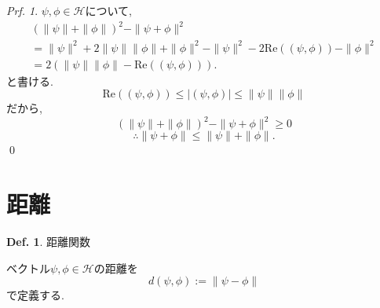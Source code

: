 \documentclass[a4paper,10pt,report]{amsart}
\theoremstyle{plain}
\theoremstyle{definition}
\newtheorem{defn}{Def.}[section]
\theoremstyle{remark}
\newtheorem{prf}{Prf.}
\begin{document}
\begin{prf}
    \(\psi,\phi\in\mathcal{H}\)について, 
    \begin{align*}
        {(\|\psi{}\|+\|\phi{}\|)}^{2}-\|\psi+\phi{}\|^{2}\\
        =\|\psi{}\|^{2}+2\|\psi{}\|{}\|\phi{}\|+\|\phi{}\|^{2}-\|\psi{}\|^{2}-2\mathrm{Re}((\psi,\phi))-\|\phi{}\|^{2}\\
        =2(\|\psi{}\|{}\|\phi{}\|-\mathrm{Re}((\psi,\phi))).
    \end{align*}
    と書ける. 
    \begin{equation*}
        \mathrm{Re}((\psi,\phi))\leq|(\psi,\phi)|\leq{}\|\psi{}\|{}\|\phi{}\|
    \end{equation*}
    だから,
    \begin{equation*}
        {(\|\psi{}\|+\|\phi{}\|)}^{2}-\|\psi+\phi{}\|^{2}\geq0
    \end{equation*}
    \begin{equation*}
        \therefore \|\psi+\phi{}\|\leq{}\|\psi{}\|+\|\phi{}\|.
    \end{equation*}
    \qed{}
\end{prf}
\section{距離}
\begin{leftbar}
    \begin{defn}距離関数\par
        ベクトル\(\psi,\phi\in\mathcal{H}\)の距離を
        \begin{equation}
            d(\psi,\phi):=\|\psi-\phi{}\|
        \end{equation}
        で定義する.
    \end{defn}
\end{leftbar}
\end{document}
